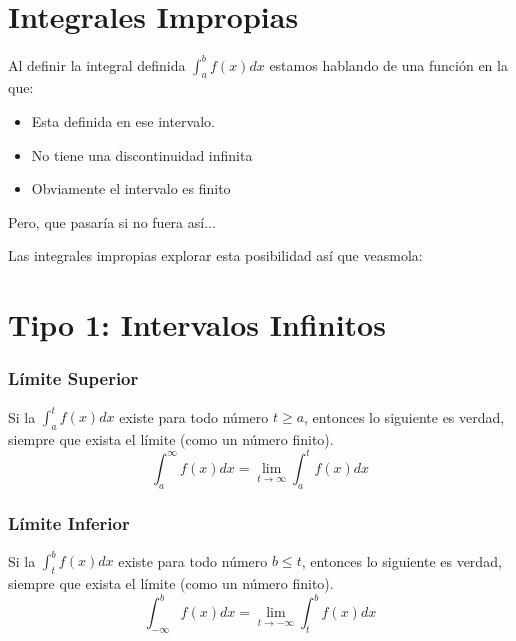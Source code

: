 \documentclass[12pt]{report}                                %
\begin{document}
    \section{Integrales Impropias}

        Al definir la integral definida $\int_a^b f(x) dx$ estamos hablando
        de una función en la que:

        \begin{itemize}
            \item Esta definida en ese intervalo.
            \item No tiene una discontinuidad infinita
            \item Obviamente el intervalo es finito
        \end{itemize}

        Pero, que pasaría si no fuera así...

        Las integrales impropias explorar esta posibilidad así que veasmola:

    \clearpage
    \section{Tipo 1: Intervalos Infinitos}

        \subsubsection{Límite Superior}
        Si la $\int_a^t f(x) dx$ existe para todo número $t \geq a$, entonces
        lo siguiente es verdad, siempre que exista el límite (como un número finito).
        \begin{equation}
            \int_a^{\infty} f(x) dx = \lim_{t \to \infty} \int_a^t f(x) dx
        \end{equation}

        \subsubsection{Límite Inferior}
        Si la $\int_t^b f(x) dx$ existe para todo número $b \leq t$, entonces lo
        siguiente es verdad, siempre que exista el límite (como un número finito).
        \begin{equation}
            \int_{- \infty}^b f(x) dx = \lim_{t \to - \infty} \int_t^b f(x) dx
        \end{equation}
\end{document}
